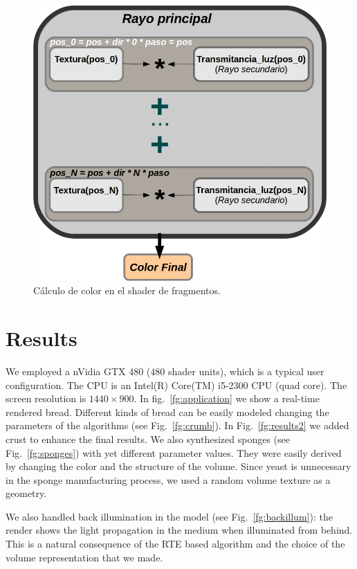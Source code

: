 \begin{figure}[htb!]
  \centerline{\includegraphics[width=13cm]{fragmentshader}}
  \caption{Cálculo de color en el shader de fragmentos. }
  \label{fg:fragmentshader}
\end{figure}



\section{Results}


We employed a nVidia GTX 480 ($480$ shader units), which is a typical user configuration.
The CPU is an Intel(R) Core(TM) i5-2300 CPU (quad core).
The screen resolution is $1440\times900$.
In fig.~\ref{fg:application} we show a real-time rendered bread.
Different kinds of bread can be easily modeled changing the parameters of the algorithms (see Fig.~\ref{fg:crumb}).
In Fig.~\ref{fg:results2} we added crust to enhance the final results. 
We also synthesized sponges (see Fig.~\ref{fg:sponges}) with yet different parameter values.
They were easily derived by changing the color and the structure of the volume.
Since yeast is unnecessary in the sponge manufacturing process, we used a random volume texture as a geometry.

We also handled back illumination in the model (see Fig.~\ref{fg:backillum}): the render shows the light propagation in the medium when illuminated from behind.
This is a natural consequence of the RTE based algorithm and the choice of the volume representation that we made.

